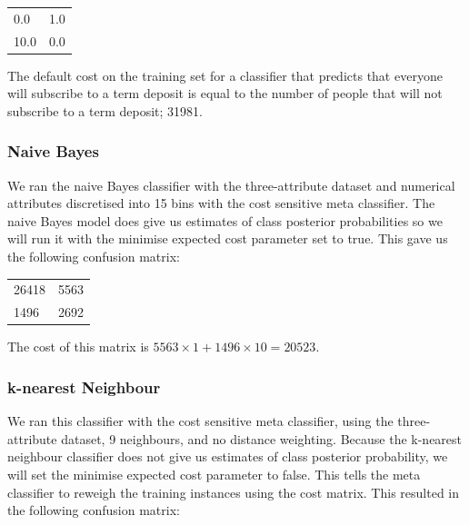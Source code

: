 \documentclass[a4paper,11pt]{article}
\begin{document}
\begin{table}[H]
  \begin{center}
    \begin{tabular}{l l }
      0.0 & 1.0 \\
      10.0 & 0.0 \\
    \end{tabular}
  \end{center}
  \label{tab:costMatrixStructure}
\end{table}

The default cost on the training set for a classifier that predicts that everyone will subscribe to a term deposit is equal
to the number of people that will not subscribe to a term deposit; 31981.

\subsubsection{Naive Bayes}

We ran the naive Bayes classifier with the three-attribute dataset and numerical attributes discretised into 15 bins
with the cost sensitive meta classifier. The naive Bayes model does give us estimates of class posterior
probabilities so we will run it with the minimise expected cost parameter set to true. This gave us the 
following confusion matrix:

\begin{table}[H]
  \begin{center}
    \begin{tabular}{l l }
      26418 & 5563 \\
      1496 & 2692 \\
    \end{tabular}
  \end{center}
  \label{tab:naiveBayesCost}
\end{table}

The cost of this matrix is $ 5563 \times 1 + 1496 \times 10 = 20523 $.

\subsubsection{k-nearest Neighbour}

We ran this classifier with the cost sensitive meta classifier, using the three-attribute dataset, 9 neighbours, 
and no distance weighting. Because the k-nearest neighbour classifier does not give us estimates of class posterior 
probability, we will set the minimise expected cost parameter to false. This tells the meta classifier to reweigh 
the training instances using the cost matrix. This resulted in the following confusion matrix:
\end{document}
